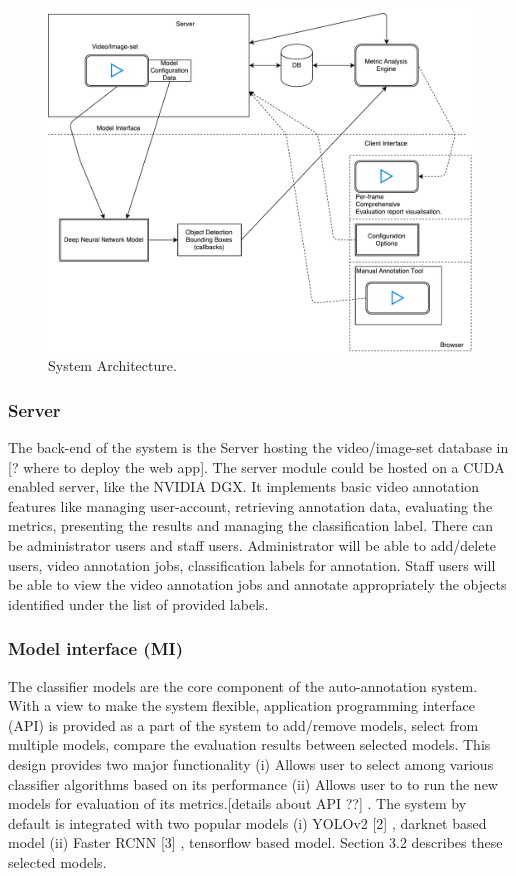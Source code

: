 \documentclass[conference]{IEEEtran}
\newcommand{\figwidthb}{0.80\linewidth}
\begin{document}
\begin{figure}[htb]
\centering
\includegraphics[width=\figwidthb]{fig/system_architecture.pdf}
\caption{System Architecture.} \label{fig.structure}
\end{figure}

\subsubsection{Server}
The back-end of the system is the Server hosting  the  video/image-set database in [? where to deploy the web app]. The server module could be hosted on a CUDA enabled server, like the NVIDIA DGX. It implements basic video annotation features like managing user-account, retrieving annotation data, evaluating the metrics, presenting the results and managing the classification label. There can be administrator users and staff users. Administrator will be able to add/delete users, video annotation jobs, classification labels for annotation. Staff users will be able to view the video annotation jobs and annotate appropriately the objects identified under the list of provided labels.
\subsubsection{Model interface (MI)}
The classifier models are the core component of the auto-annotation system. With a view to make the system flexible, application programming interface (API) is provided as a part of the system to add/remove models, select from multiple models, compare the  evaluation results between selected models. This design provides two major functionality (i) Allows user to select among various classifier algorithms based on its performance (ii)  Allows user to  to run the new models for evaluation of its metrics.[details about API ??] . The system by default is integrated with two popular models (i) YOLOv2 [2] , darknet based model (ii) Faster RCNN [3] , tensorflow based model. Section 3.2 describes these selected models.
\end{document}
